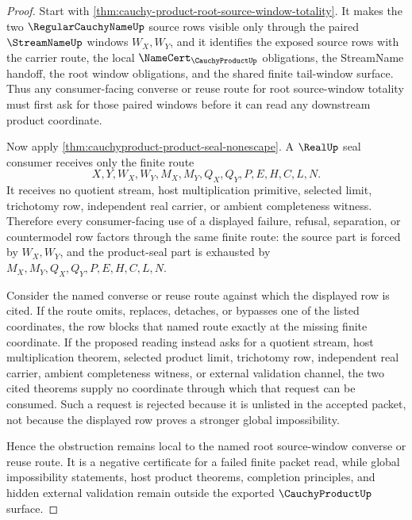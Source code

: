 \begin{proof}
Start with \autoref{thm:cauchy-product-root-source-window-totality}. It makes the two $\RegularCauchyNameUp$ source rows visible only through the paired $\StreamNameUp$ windows $W_X,W_Y$, and it identifies the exposed source rows with the carrier route, the local $\NameCert_{\CauchyProductUp}$ obligations, the StreamName handoff, the root window obligations, and the shared finite tail-window surface. Thus any consumer-facing converse or reuse route for root source-window totality must first ask for those paired windows before it can read any downstream product coordinate.

Now apply \autoref{thm:cauchyproduct-product-seal-nonescape}. A $\RealUp$ seal consumer receives only the finite route
$$
X,Y,W_X,W_Y,M_X,M_Y,Q_X,Q_Y,P,E,H,C,L,N .
$$
It receives no quotient stream, host multiplication primitive, selected limit, trichotomy row, independent real carrier, or ambient completeness witness. Therefore every consumer-facing use of a displayed failure, refusal, separation, or countermodel row factors through the same finite route: the source part is forced by $W_X,W_Y$, and the product-seal part is exhausted by $M_X,M_Y,Q_X,Q_Y,P,E,H,C,L,N$.

Consider the named converse or reuse route against which the displayed row is cited. If the route omits, replaces, detaches, or bypasses one of the listed coordinates, the row blocks that named route exactly at the missing finite coordinate. If the proposed reading instead asks for a quotient stream, host multiplication theorem, selected product limit, trichotomy row, independent real carrier, ambient completeness witness, or external validation channel, the two cited theorems supply no coordinate through which that request can be consumed. Such a request is rejected because it is unlisted in the accepted packet, not because the displayed row proves a stronger global impossibility.

Hence the obstruction remains local to the named root source-window converse or reuse route. It is a negative certificate for a failed finite packet read, while global impossibility statements, host product theorems, completion principles, and hidden external validation remain outside the exported $\CauchyProductUp$ surface.
\end{proof}
